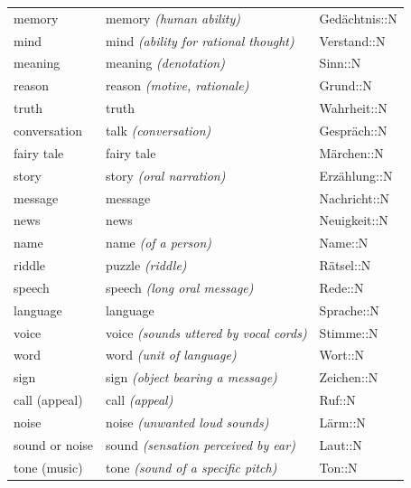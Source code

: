 \begin{center}
\begin{longtable}{lll}
{\sc \lowercase{	MEMORY	}}	&	memory	\textit{\footnotesize (human ability)}	&	Gedächtnis::N	\\
{\sc \lowercase{	MIND	}}	&	mind	\textit{\footnotesize (ability for rational thought)}	&	Verstand::N	\\
{\sc \lowercase{	MEANING	}}	&	meaning	\textit{\footnotesize (denotation)}	&	Sinn::N	\\
{\sc \lowercase{	REASON	}}	&	reason	\textit{\footnotesize (motive, rationale)}	&	Grund::N	\\
{\sc \lowercase{	TRUTH	}}	&	truth		&	Wahrheit::N	\\
{\sc \lowercase{	CONVERSATION	}}	&	talk	\textit{\footnotesize (conversation)}	&	Gespräch::N	\\
{\sc \lowercase{	FAIRY TALE	}}	&	fairy tale		&	Märchen::N	\\
{\sc \lowercase{	STORY	}}	&	story	\textit{\footnotesize (oral narration)}	&	Erzählung::N	\\
{\sc \lowercase{	MESSAGE	}}	&	message		&	Nachricht::N	\\
{\sc \lowercase{	NEWS	}}	&	news		&	Neuigkeit::N	\\
{\sc \lowercase{	NAME	}}	&	name	\textit{\footnotesize (of a person)}	&	Name::N	\\
{\sc \lowercase{	RIDDLE	}}	&	puzzle	\textit{\footnotesize (riddle)}	&	Rätsel::N	\\
{\sc \lowercase{	SPEECH	}}	&	speech	\textit{\footnotesize (long oral message)}	&	Rede::N	\\
{\sc \lowercase{	LANGUAGE	}}	&	language		&	Sprache::N	\\
{\sc \lowercase{	VOICE	}}	&	voice	\textit{\footnotesize (sounds uttered by vocal cords)}	&	Stimme::N	\\
{\sc \lowercase{	WORD	}}	&	word	\textit{\footnotesize (unit of language)}	&	Wort::N	\\
{\sc \lowercase{	SIGN	}}	&	sign	\textit{\footnotesize (object bearing a message)}	&	Zeichen::N	\\
{\sc \lowercase{	CALL \footnotesize (APPEAL)	}}	&	call	\textit{\footnotesize (appeal)}	&	Ruf::N	\\
{\sc \lowercase{	NOISE	}}	&	noise	\textit{\footnotesize (unwanted loud sounds)}	&	Lärm::N	\\
{\sc \lowercase{	SOUND OR NOISE	}}	&	sound	\textit{\footnotesize (sensation perceived by ear)}	&	Laut::N	\\
{\sc \lowercase{	TONE \footnotesize (MUSIC)	}}	&	tone	\textit{\footnotesize (sound of a specific pitch)}	&	Ton::N	\\

\end{longtable}
\end{center}
